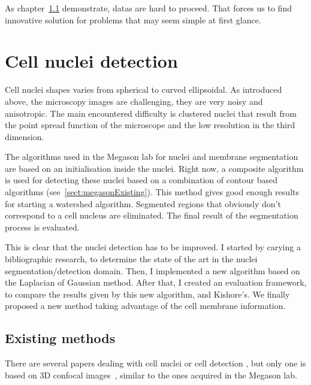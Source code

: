 %
%

As chapter~\ref{} demonstrate, datas are hard to proceed. That forces us to find innovative solution for problems that may seem simple at first glance.

\section{Cell nuclei detection}

Cell nuclei shapes varies from spherical to curved ellipsoidal. As introduced above, the microscopy images are challenging, they are very noisy and anisotropic.
The main encountered difficulty is clustered nuclei that result from the point spread function of the microscope and the low resolution in the third dimension.

The algorithms used in the Megason lab for nuclei and membrane segmentation are based on an initialisation inside the nuclei.
Right now, a composite algorithm is used for detecting these nuclei based on a combination of contour based algorithms (see~\ref{sect:megasonExisting}).
This method gives good enough results for starting a watershed algorithm. Segmented regions that obviously don't correspond to a cell nucleus are eliminated. The final result of the segmentation process is evaluated.


This is clear that  the nuclei detection has to be improved.
I started by carying a bibliographic research, to determine the state of the art in the nuclei segmentation/detection domain.
Then, I implemented a new algorithm based on the Laplacian of Gaussian method.
After that, I created an evaluation framework, to compare the results given by this new algorithm, and Kishore's.
We finally proposed a new method taking advantage of the cell membrane information.



\subsection{Existing methods}

There are several papers dealing with cell nuclei or cell detection 
\cite{loukas2003image,umesh2001efficient,al2009improved},
but only one is based on 3D confocal images~\cite{li20073}, similar to the ones acquired in the Megason lab.

